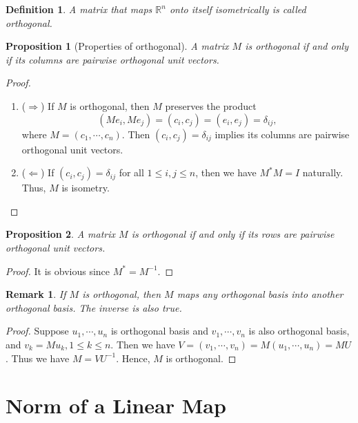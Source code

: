 \documentclass[11pt]{book}
\newtheorem{definition}{Definition}[chapter]
\newtheorem{proposition}{Proposition}[chapter]
\newtheorem{remark}{Remark}[chapter]
\theoremstyle{definition}
\numberwithin{equation}{chapter}
\begin{document}
\medskip

\begin{definition}
A matrix that maps $\mathbb{R}^n$ onto itself isometrically is called orthogonal.
\end{definition}

\medskip

\begin{proposition}[Properties of orthogonal]
A matrix $M$ is orthogonal if and only if its columns are pairwise orthogonal unit vectors.
\end{proposition}
\begin{proof}
~\begin{enumerate}[label=(\arabic*)]
    \item ($\Rightarrow$) If $M$ is orthogonal, then $M$ preserves the product $$(Me_i, Me_j) = (c_i, c_j) = (e_i,e_j) = \delta_{ij},$$ 
    where $M = (c_1,\cdots,c_n)$. Then $(c_i, c_j) = \delta_{ij}$ implies its columns are pairwise orthogonal unit vectors.
    \item ($\Leftarrow$) If $(c_i, c_j) = \delta_{ij}$ for all $1\leq i, j\leq n$, then we have $M^* M = I$ naturally. Thus, $M$ is isometry.
\end{enumerate}
\end{proof}

\medskip

\begin{proposition}
A matrix $M$ is orthogonal if and only if its rows are pairwise orthogonal unit vectors.
\end{proposition}
\begin{proof}
It is obvious since $M^* = M^{-1}$.
\end{proof}

\begin{remark}
If $M$ is orthogonal, then $M$ maps any orthogonal basis into another orthogonal basis. The inverse is also true.
\end{remark}
\begin{proof}
Suppose $u_1,\cdots,u_n$ is orthogonal basis and $v_1,\cdots,v_n$ is also orthogonal basis, and $v_k = Mu_k, 1\leq k \leq n$. Then we have
$V = (v_1,\cdots,v_n) = M (u_1,\cdots,u_n) = MU$. Thus we have $M = VU^{-1}$. Hence, $M$ is orthogonal.
\end{proof}

\medskip

\section{Norm of a Linear Map}
\end{document}
